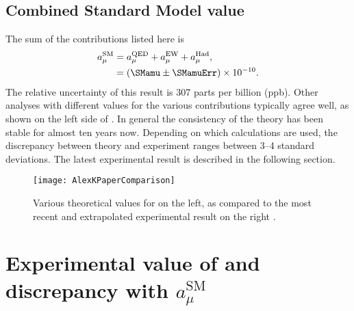 \subsection{Combined Standard Model value}

The sum of the \amu contributions listed here is \cite{Kinoshita1,Kinoshita2,EW1,EW2,Keshavarzi:2018mgv,Nyffeler:2016gnb}
		\begin{equation}
		\begin{aligned}
            a_{\mu}^{\text{SM}} &= a_{\mu}^{\text{QED}} + a_{\mu}^{\text{EW}} + a_{\mu}^{\text{Had}}, \\
			&= (\SMamu \pm \SMamuErr) \times 10^{-10}.
		\end{aligned}
		\end{equation}
The relative uncertainty of this result is 307 parts per billion (ppb). Other analyses with different values for the various contributions typically agree well, as shown on the left side of . In general the consistency of the theory has been stable for almost ten years now. Depending on which calculations are used, the discrepancy between theory and experiment ranges between \SIrange{3}{4}{} standard deviations. The latest experimental result is described in the following section.

\begin{figure}
	\centering
	\texttt{[image: AlexKPaperComparison]}
	\caption[Comparison between theoretical and experimental values for \amu]{Various theoretical values for \amu on the left, as compared to the most recent and extrapolated experimental result on the right \cite{Keshavarzi:2018mgv}.}
	\label{fig:AlexKPaperComparison}
\end{figure}


\section{Experimental value of \amu and discrepancy with \texorpdfstring{$a_{\mu}^{\text{SM}}$}{amusm}}
\label{sec:Background}


